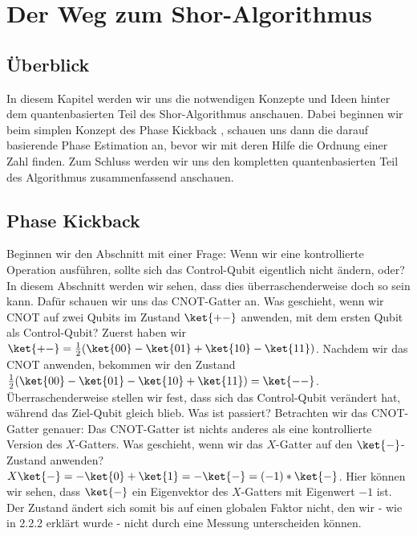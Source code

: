 \chapter{Der Weg zum Shor-Algorithmus}
\section{Überblick}
In diesem Kapitel werden wir uns die notwendigen Konzepte und Ideen hinter dem quantenbasierten Teil des Shor-Algorithmus anschauen. Dabei beginnen wir beim simplen Konzept des \grqq Phase Kickback\grqq{} , schauen uns dann die darauf basierende \grqq Phase Estimation\grqq{} an, bevor wir mit deren Hilfe die Ordnung einer Zahl finden. Zum Schluss werden wir uns den kompletten quantenbasierten Teil des Algorithmus zusammenfassend anschauen.
\section{Phase Kickback}
Beginnen wir den Abschnitt mit einer Frage: Wenn wir eine kontrollierte Operation ausführen, sollte sich das Control-Qubit eigentlich nicht ändern, oder? In diesem Abschnitt werden wir sehen, dass dies überraschenderweise doch so sein kann. Dafür schauen wir uns das CNOT-Gatter an. Was geschieht, wenn wir CNOT auf zwei Qubits im Zustand $\ket{+-}$ anwenden, mit dem ersten Qubit als Control-Qubit? Zuerst haben wir $\ket{+-} = \frac{1}{2}(\ket{00} - \ket{01} + \ket{10} - \ket{11})$. Nachdem wir das CNOT anwenden, bekommen wir den Zustand $\frac{1}{2}(\ket{00} - \ket{01} - \ket{10} + \ket{11}) = \ket{--}$. Überraschenderweise stellen wir fest, dass sich das Control-Qubit verändert hat, während das Ziel-Qubit gleich blieb. Was ist passiert? Betrachten wir das CNOT-Gatter genauer: Das CNOT-Gatter ist nichts anderes als eine kontrollierte Version des $X$-Gatters. Was geschieht, wenn wir das $X$-Gatter auf den $\ket{-}$-Zustand anwenden? $X\ket{-} = -\ket{0} + \ket{1} = -\ket{-} = (-1)*\ket{-}$. Hier können wir sehen, dass $\ket{-}$ ein Eigenvektor des $X$-Gatters mit Eigenwert $-1$ ist. Der Zustand ändert sich somit bis auf einen globalen Faktor nicht, den wir - wie in 2.2.2 erklärt wurde - nicht durch eine Messung unterscheiden können.

\paragraph{}

